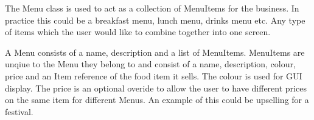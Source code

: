 	\begin{minipage}[t]{.6\linewidth}
		The Menu class is used to act as a collection of MenuItems for the business. In practice this could be a breakfast menu, lunch menu, drinks menu etc. Any type of items which the user would like to combine together into one screen.
		\linebreak
		
		A Menu consists of a name, description and a list of MenuItems. MenuItems are unqiue to the Menu they belong to and consist of a name, description, colour, price and an Item reference of the food item it sells. The colour is used for GUI display. The price is an optional overide to allow the user to have different prices on the same item for different Menus. An example of this could be upselling for a festival.
		
	\end{minipage}
	\hspace{0.02\linewidth}
